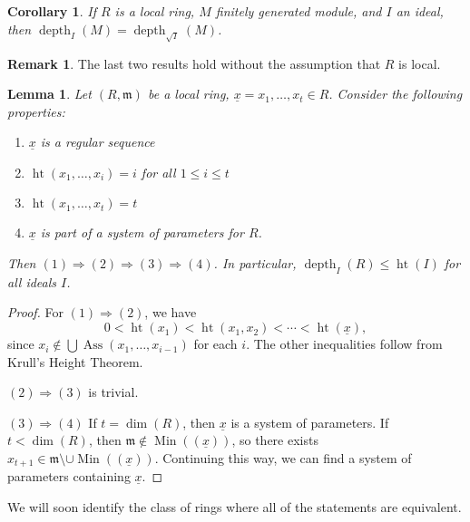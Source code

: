 \documentclass[11pt]{book}
\newtheorem{lemma}[theorem]{Lemma}
\newtheorem{corollary}[theorem]{Corollary}
\numberwithin{equation}{section}
\numberwithin{theorem}{chapter}
\theoremstyle{definition}
\newtheorem*{basic properties}{Basic Properties}
\newtheorem*{Important Remark}{Important Remark}
\newtheorem{remark}[theorem]{Remark}
\theoremstyle{remark}
\newcommand{\m}{\mathfrak{m}}
\newcommand{\Ass}{\operatorname{Ass}}
\newcommand{\height}{\operatorname{ht}}
\newcommand{\Min}{\operatorname{Min}}
\renewcommand{\dim}{\operatorname{dim}}
\newcommand{\depth}{\operatorname{depth}}
\renewcommand{\height}{\operatorname{ht}}
\begin{document}
\begin{corollary}
	If $R$ is a local ring, $M$ finitely generated module, and $I$ an ideal, then $\depth_I(M) = \depth_{\sqrt{I}}(M)$.
\end{corollary}

\begin{remark}
	The last two results hold without the assumption that $R$ is local.
\end{remark}

\begin{lemma}
	Let $(R,\m)$ be a local ring, $\underline{x} = x_1, \ldots, x_t \in R$. Consider the following properties:
	\begin{enumerate}[(1)]
		\item $\underline{x}$ is a regular sequence
		\item $\height(x_1, \ldots, x_i) = i$ for all $1 \leqslant i \leqslant t$
		\item $\height(x_1, \ldots, x_t) = t$
		\item $\underline{x}$ is part of a system of parameters for $R$.
	\end{enumerate}
	Then $(1) \Rightarrow (2) \Rightarrow (3) \Rightarrow (4)$. In particular, $\depth_I(R) \leqslant \height(I)$ for all ideals $I$.
\end{lemma}

\begin{proof}
	For $(1) \Rightarrow (2)$, we have
	$$0 < \height(x_1) < \height(x_1,x_2) < \cdots < \height(\underline{x}),$$
	since $x_i \notin \bigcup \Ass(x_1, \ldots, x_{i-1})$ for each $i$. The other inequalities follow from Krull's Height Theorem.
	
	$(2) \Rightarrow (3)$ is trivial.
	
	
	$(3) \Rightarrow (4)$ If $t = \dim(R)$, then $\underline{x}$ is a system of parameters. If $t<\dim(R)$, then $\m \notin \Min(( \underline{x} ))$, so there exists $x_{t+1} \in \m \setminus \cup \Min((\underline{x}))$. Continuing this way, we can find a system of parameters containing $\underline{x}$.
	
\end{proof}


We will soon identify the class of rings where all of the statements are equivalent.
\end{document}
